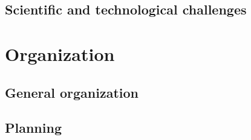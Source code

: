 \documentclass[11pt]{article}
\begin{document}
\subsection{Scientific and technological challenges}
\label{sec:orgd5ce104}

\section{Organization}
\label{sec:orga849b58}
\subsection{General organization}
\label{sec:org1d18b0c}

\subsection{Planning}
\label{sec:orgbf4df68}





\end{document}
